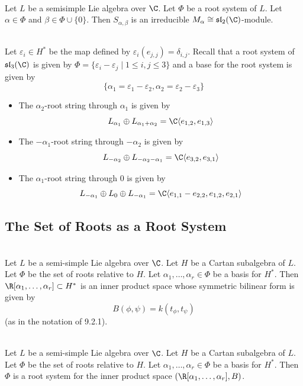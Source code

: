 \documentclass[a4paper]{article}
\begin{document}
\begin{prp}{}{} \\Let $L$ be a semisimple Lie algebra over $\C$. Let $\Phi$ be a root system of $L$. Let $\alpha\in\Phi$ and $\beta\in\Phi\cup\{0\}$. Then $S_{\alpha,\beta}$ is an irreducible $M_\alpha\cong\mathfrak{sl}_2(\C)$-module. 
\end{prp}

\begin{eg}{}{} \\Let $\varepsilon_i\in H^\ast$ be the map defined by $\varepsilon_i(e_{j,j})=\delta_{i,j}$. Recall that a root system of $\mathfrak{sl}_3(\C)$ is given by $\Phi=\{\varepsilon_i-\varepsilon_j\;|\;1\leq i,j\leq 3\}$ and a base for the root system is given by $$\{\alpha_1=\varepsilon_1-\varepsilon_2, \alpha_2=\varepsilon_2-\varepsilon_3\}$$
\begin{itemize}
\item The $\alpha_2$-root string through $\alpha_1$ is given by $$L_{\alpha_1}\oplus L_{\alpha_1+\alpha_2}=\C\langle e_{1,2}, e_{1,3}\rangle$$
\item The $-\alpha_1$-root string through $-\alpha_2$ is given by $$L_{-\alpha_2}\oplus L_{-\alpha_2-\alpha_1}=\C\langle e_{3,2},e_{3,1}\rangle$$
\item The $\alpha_1$-root string through $0$ is given by $$L_{-\alpha_1}\oplus L_0\oplus L_{-\alpha_1}=\C\langle e_{1,1}-e_{2,2},e_{1,2}, e_{2,1}\rangle$$
\end{itemize}
\end{eg}

\subsection{The Set of Roots as a Root System}
\begin{prp}{}{} \\Let $L$ be a semi-simple Lie algebra over $\C$. Let $H$ be a Cartan subalgebra of $L$. Let $\Phi$ be the set of roots relative to $H$. Let $\alpha_1,\dots,\alpha_r\in\Phi$ be a basis for $H^\ast$. Then $\R[\alpha_1,\dots,\alpha_r]\subset H^\ast$ is an inner product space whose symmetric bilinear form is given by $$B(\phi,\psi)= k(t_\phi,t_\psi)$$ (as in the notation of 9.2.1). 
\end{prp}

\begin{prp}{}{} \\Let $L$ be a semi-simple Lie algebra over $\C$. Let $H$ be a Cartan subalgebra of $L$. Let $\Phi$ be the set of roots relative to $H$. Let $\alpha_1,\dots,\alpha_r\in\Phi$ be a basis for $H^\ast$. Then $\Phi$ is a root system for the inner product space $(\R[\alpha_1,\dots,\alpha_r],B)$. 
\end{prp}
\end{document}
